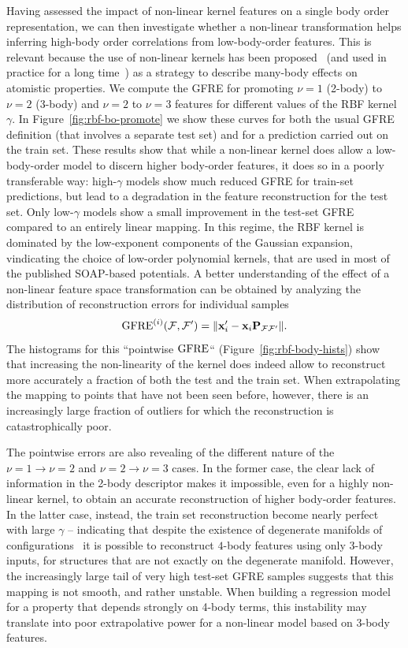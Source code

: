 Having assessed the impact of non-linear kernel features on a single body order representation, we can then investigate whether a non-linear transformation helps inferring high-body order correlations from low-body-order features.
This is relevant because the use of non-linear kernels has been proposed~\cite{glie+18prb} (and used in practice for a long time~\cite{bart+10prl,bart+13prb}) as a strategy to describe many-body effects on atomistic properties.
We compute the GFRE for promoting $\nu=1$ (2-body) to $\nu=2$ (3-body) and $\nu=2$ to $\nu=3$ features for different values of the RBF kernel $\gamma$. 
In Figure~\ref{fig:rbf-bo-promote} we show these curves for both the usual GFRE definition (that involves a separate test set) and for a prediction carried out on the train set. 
These results show that while a non-linear kernel does allow a low-body-order model to discern higher body-order features, it does so in a poorly transferable way: high-$\gamma$ models show much reduced GFRE for train-set predictions, but lead to a degradation in the feature reconstruction for the test set. 
Only low-$\gamma$ models show a small improvement in the test-set GFRE compared to an entirely linear mapping. In this regime, the RBF kernel is dominated by the low-exponent components of the Gaussian expansion, vindicating the choice of low-order polynomial kernels, that are used in most of the published SOAP-based potentials. 
A better understanding of the effect of a non-linear feature space transformation can be obtained by analyzing the distribution of reconstruction errors for individual samples
\begin{equation}
\operatorname{GFRE}^{(i)}(\mathcal{F},\mathcal{F}^{\prime}) = \norm{\mathbf{x}^{\prime}_i - \mathbf{x}_i\mathbf{P}_{{\mathcal{F}}{\mathcal{F}^{\prime}}}}. 
\label{eq:pointwise_GFRE}
\end{equation}
The histograms for this ``pointwise $\operatorname{GFRE}$`` (Figure~\ref{fig:rbf-body-hists}) show that increasing the non-linearity of the kernel does indeed allow to reconstruct more accurately a fraction of both the test and the train set. When extrapolating the mapping to points that have not been seen before, however, there is an increasingly large fraction of outliers for which the reconstruction is catastrophically poor.

The pointwise errors are also revealing of the different nature of the $\nu=1\rightarrow \nu=2$ and $\nu=2\rightarrow \nu=3$ cases.
In the former case, the clear lack of information in the 2-body descriptor makes it impossible, even for a highly non-linear kernel, to obtain an accurate reconstruction of higher body-order features.
In the latter case, instead, the train set reconstruction become nearly perfect with large $\gamma$ -- indicating that despite the existence of degenerate manifolds of configurations~\cite{pozd+20prl} it is possible to reconstruct $4$-body features using only $3$-body inputs, for  structures that are not exactly on the degenerate manifold.
However, the increasingly large tail of very high test-set GFRE samples suggests that this mapping is not smooth, and rather unstable. When building a regression model for a property that depends strongly on 4-body terms, this instability may translate into poor extrapolative power for a non-linear model based on 3-body features.

